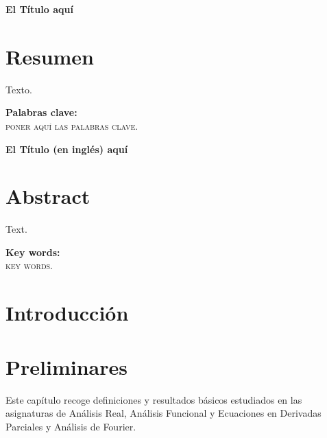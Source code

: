 \documentclass[a4paper, 12pt, oneside]{book}
\begin{document}

{\let\clearpage\relax

{\Large \textbf{El Título aquí}}\\

\chapter*{Resumen}}

Texto.

\vfill

\textbf{Palabras clave:}\\

\textsc{poner aquí las palabras clave.}

\pagebreak



{\let\clearpage\relax

{\Large \textbf{El Título (en inglés) aquí}}\\

\chapter*{Abstract}
}

Text. 

\vfill

\textbf{Key words:}\\

\textsc{key words.}



\chapter*{Introducción}



\chapter{Preliminares}

\setcounter{page}{1} 

Este capítulo recoge definiciones y resultados básicos estudiados en las asignaturas de Análisis Real, Análisis Funcional y Ecuaciones en Derivadas Parciales y Análisis de Fourier.
\end{document}
